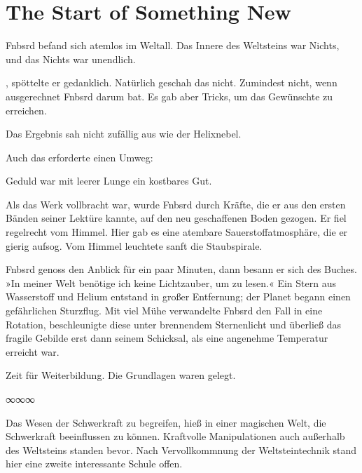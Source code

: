 \chapter{The Start of Something New}

Fnbsrd befand sich atemlos im Weltall. Das Innere des Weltsteins war Nichts, und das Nichts war unendlich.

, spöttelte er gedanklich. Natürlich geschah das nicht. Zumindest nicht, wenn ausgerechnet Fnbsrd darum bat. Es gab aber Tricks, um das Gewünschte zu erreichen. 

Das Ergebnis sah nicht zufällig aus wie der Helixnebel.

 Auch das erforderte einen Umweg: 

Geduld war mit leerer Lunge ein kostbares Gut. 

Als das Werk vollbracht war, wurde Fnbsrd durch Kräfte, die er aus den ersten Bänden seiner Lektüre kannte, auf den neu geschaffenen Boden gezogen. Er fiel regelrecht vom Himmel. Hier gab es eine atembare Sauerstoffatmosphäre, die er gierig aufsog. Vom Himmel leuchtete sanft die Staubspirale.

Fnbsrd genoss den Anblick für ein paar Minuten, dann besann er sich des Buches. »In meiner Welt benötige ich keine Lichtzauber, um zu lesen.« Ein Stern aus Wasserstoff und Helium entstand in großer Entfernung; der Planet begann einen gefährlichen Sturzflug. Mit viel Mühe verwandelte Fnbsrd den Fall in eine Rotation, beschleunigte diese unter brennendem Sternenlicht und überließ das fragile Gebilde erst dann seinem Schicksal, als eine angenehme Temperatur erreicht war.

Zeit für Weiterbildung. Die Grundlagen waren gelegt.

\begin{center}
∞∞∞
\end{center}

Das Wesen der Schwerkraft zu begreifen, hieß in einer magischen Welt, die Schwerkraft beeinflussen zu können. Kraftvolle Manipulationen auch außerhalb des Weltsteins standen bevor. Nach Vervollkommnung der Weltsteintechnik stand hier eine zweite interessante Schule offen.

